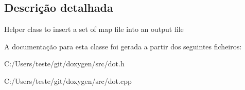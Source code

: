 \subsection{Descrição detalhada}
Helper class to insert a set of map file into an output file 

A documentação para esta classe foi gerada a partir dos seguintes ficheiros\-:\begin{DoxyCompactItemize}
\item 
C\-:/\-Users/teste/git/doxygen/src/dot.\-h\item 
C\-:/\-Users/teste/git/doxygen/src/dot.\-cpp\end{DoxyCompactItemize}
